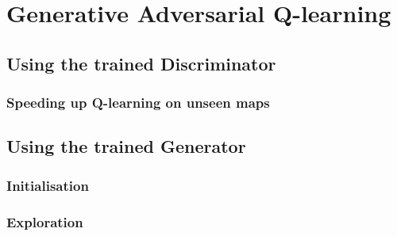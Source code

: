 
\chapter{Generative Adversarial Q-learning} %

\label{Chapter6}

\section{Using the trained Discriminator}
\subsection{Speeding up Q-learning on unseen maps}


\section{Using the trained Generator}
\subsection{Initialisation}
\subsection{Exploration}

